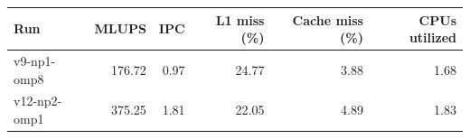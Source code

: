 \begin{tabular}{@{}lrrrrr@{}}
\toprule
Run & MLUPS & IPC & L1 miss (\%) & Cache miss (\%) & CPUs utilized \\
\midrule
v9-np1-omp8 & 176.72 & 0.97 & 24.77 & 3.88 & 1.68 \\
v12-np2-omp1 & 375.25 & 1.81 & 22.05 & 4.89 & 1.83 \\
\bottomrule
\end{tabular}
